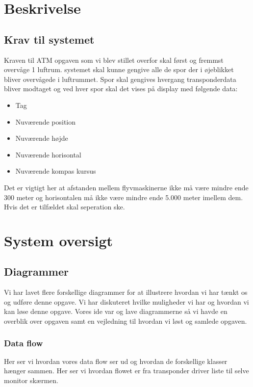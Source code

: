\section{Beskrivelse}
\subsection{Krav til systemet}
Kraven til ATM opgaven som vi blev stillet overfor skal først og fremmst overvåge 1 luftrum. systemet skal kunne gengive alle de spor der i øjeblikket bliver overvågede i luftrummet. 
Spor skal gengives hvergang transponderdata bliver modtaget og ved hver spor skal det vises på display med følgende data: 
\begin{itemize}
    \item Tag
    \item Nuværende position
    \item Nuværende højde
    \item Nuværende horisontal 
    \item Nuværende kompas kursus
\end{itemize}
Det er vigtigt her at afstanden mellem flyvmaskinerne ikke må være mindre ende 300 meter og horisontalen må ikke være mindre ende 5.000 meter imellem dem. Hvis det er tilfældet skal 
seperation ske.


\newpage

\section{System oversigt}

\subsection{Diagrammer}
Vi har lavet flere forskellige diagrammer for at illustrere hvordan vi har tænkt os og udføre denne opgave. Vi har diskuteret hvilke muligheder vi har og 
hvordan vi kan løse denne opgave. Vores ide var og lave diagrammerne så vi havde en overblik over opgaven samt en vejledning til hvordan vi løst og samlede opgaven.  

\subsubsection{Data flow}
Her ser vi hvordan vores data flow ser ud og hvordan de forskellige klasser hænger sammen. Her ser vi hvordan flowet er fra transponder driver liste til selve monitor skærmen. 

